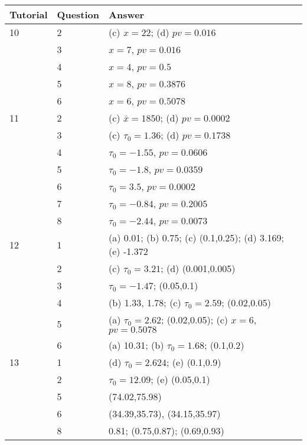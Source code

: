 \documentclass[bigtut]{tutorial}
\begin{document}
\begin{tutorial}
\begin{tabular}{|l |l |l |} \hline
Tutorial & Question & Answer \\ \hline
10 & 2 & (c) $x=22$; (d) $pv=0.016$ \\
    & 3  & $x=7$, $pv=0.016$ \\
   & 4 & $x=4$,  $pv=0.5$ \\
   & 5 &  $x=8$, $pv=0.3876$ \\
  & 6 & $x=6$, $pv=0.5078$ \\ \hline
11 & 2 & (c) $\bar{x}=	1850$; (d) $pv=0.0002$ \\
   & 3 & (c) $\tau_{0}=1.36$; (d) $pv=0.1738$ \\
& 4 &  $\tau_{0}=-1.55$,  $pv=0.0606$ \\
& 5 &  $\tau_{0}=-1.8$,  $pv=0.0359$  \\
& 6 &  $\tau_{0}=3.5$,  $pv=0.0002$ \\
& 7 &  $\tau_{0}=-0.84$,  $pv=0.2005$ \\
& 8 &  $\tau_{0}=-2.44$,  $pv=0.0073$ \\ \hline
12 & 1 & (a) 0.01; (b) 0.75; (c) (0.1,0.25); (d) 3.169; (e) -1.372 \\
   & 2 & (c) $\tau_{0}=3.21$; (d) (0.001,0.005)  \\
  & 3 & $\tau_{0}=-1.47$; (0.05,0.1) \\
  & 4 & (b) 1.33, 1.78; (c) $\tau_{0}=2.59$; (0.02,0.05) \\
  & 5 & (a) $\tau_{0}=2.62$; (0.02,0.05); (c) $x=6$, $pv=0.5078$ \\
  & 6 & (a) 10.31; (b) $\tau_{0}=1.68$; (0.1,0.2) \\ \hline
13 & 1 & (d) $\tau_{0}=2.624$; (e) (0.1,0.9) \\
   & 2 & $\tau_{0}=12.09$; (e) (0.05,0.1) \\
  & 5 & (74.02,75.98) \\
  & 6 & (34.39,35.73), (34.15,35.97) \\
  & 8 & 0.81; (0.75,0.87); (0.69,0.93) \\ \hline
\end{tabular}



\end{tutorial}
\end{document}
